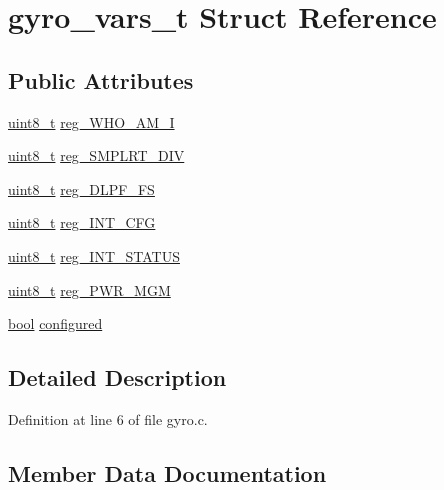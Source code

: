 \hypertarget{structgyro__vars__t}{}\section{gyro\+\_\+vars\+\_\+t Struct Reference}
\label{structgyro__vars__t}
\subsection*{Public Attributes}
\begin{DoxyCompactItemize}
\item 
\hyperlink{_p_e___types_8h_aba7bc1797add20fe3efdf37ced1182c5}{uint8\+\_\+t} \hyperlink{structgyro__vars__t_a5406fe4dcbca24cb8a7630da974de65d}{reg\+\_\+\+W\+H\+O\+\_\+\+A\+M\+\_\+I}
\item 
\hyperlink{_p_e___types_8h_aba7bc1797add20fe3efdf37ced1182c5}{uint8\+\_\+t} \hyperlink{structgyro__vars__t_a551fbdf7797290c3afd9097bd5d0a54b}{reg\+\_\+\+S\+M\+P\+L\+R\+T\+\_\+\+D\+IV}
\item 
\hyperlink{_p_e___types_8h_aba7bc1797add20fe3efdf37ced1182c5}{uint8\+\_\+t} \hyperlink{structgyro__vars__t_acd13caa115096959f839ecaa271b844d}{reg\+\_\+\+D\+L\+P\+F\+\_\+\+FS}
\item 
\hyperlink{_p_e___types_8h_aba7bc1797add20fe3efdf37ced1182c5}{uint8\+\_\+t} \hyperlink{structgyro__vars__t_a0c8f08f3e9028dae6be6e846f62b75db}{reg\+\_\+\+I\+N\+T\+\_\+\+C\+FG}
\item 
\hyperlink{_p_e___types_8h_aba7bc1797add20fe3efdf37ced1182c5}{uint8\+\_\+t} \hyperlink{structgyro__vars__t_a4c312a5985fb71e3b3928bf541fa5a78}{reg\+\_\+\+I\+N\+T\+\_\+\+S\+T\+A\+T\+US}
\item 
\hyperlink{_p_e___types_8h_aba7bc1797add20fe3efdf37ced1182c5}{uint8\+\_\+t} \hyperlink{structgyro__vars__t_a37906fc6d215031fa21a59d2d02fa88f}{reg\+\_\+\+P\+W\+R\+\_\+\+M\+GM}
\item 
\hyperlink{_p_e___types_8h_a97a80ca1602ebf2303258971a2c938e2}{bool} \hyperlink{structgyro__vars__t_a5d10abe64f81853736e62b9cc43de117}{configured}
\end{DoxyCompactItemize}


\subsection{Detailed Description}


Definition at line 6 of file gyro.\+c.



\subsection{Member Data Documentation}
